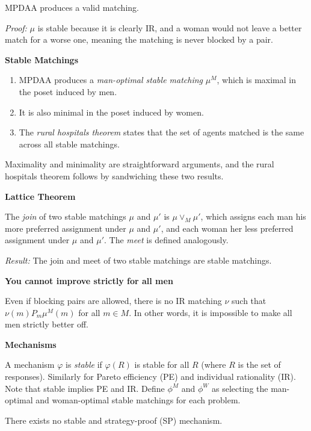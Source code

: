\documentclass[8pt]{scrartcl}
\renewcommand{\section}[1]{\begin{center}\textbf{\color{red}#1}\end{center}}
\begin{document}
\begin{multicols*}{2}
    MPDAA produces a valid matching.

\textit{Proof:} $\mu$ is stable because it is clearly IR, and a woman would not leave a better match for a worse one, meaning the matching is never blocked by a pair.

    \textbf{Stable Matchings}

\begin{enumerate}
    \item MPDAA produces a \textit{man-optimal stable matching} $\mu^M$, which is maximal in the poset induced by men.
    \item It is also minimal in the poset induced by women.
    \item The \textit{rural hospitals theorem} states that the set of agents matched is the same across all stable matchings.
\end{enumerate}

Maximality and minimality are straightforward arguments, and the rural hospitals theorem follows by sandwiching these two results.

    \textbf{Lattice Theorem}

The \textit{join} of two stable matchings $\mu$ and $\mu'$ is $\mu \lor_M \mu'$, which assigns each man his more preferred assignment under $\mu$ and $\mu'$, and each woman her less preferred assignment under $\mu$ and $\mu'$. The \textit{meet} is defined analogously.

\textit{Result:} The join and meet of two stable matchings are stable matchings.

    \textbf{You cannot improve strictly for all men}

Even if blocking pairs are allowed, there is no IR matching $\nu$ such that $\nu(m) P_m \mu^M(m)$ for all $m \in M$. In other words, it is impossible to make all men strictly better off.

\section{Mechanisms}

A mechanism $\varphi$ is \textit{stable} if $\varphi(R)$ is stable for all $R$ (where $R$ is the set of responses). Similarly for Pareto efficiency (PE) and individual rationality (IR). Note that stable implies PE and IR. Define $\phi^M$ and $\phi^W$ as selecting the man-optimal and woman-optimal stable matchings for each problem.

    There exists no stable and strategy-proof (SP) mechanism.


\end{multicols*}
\end{document}
